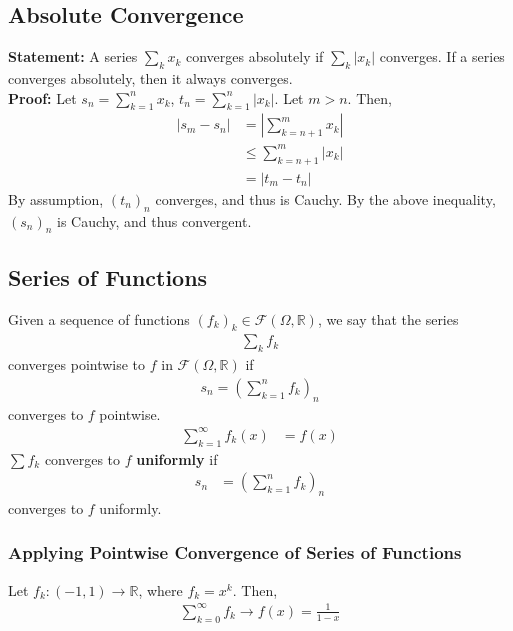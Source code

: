 \documentclass[10pt]{extarticle}
\newcommand{\R}{\mathbb{R}}
\begin{document}
  \subsection{Absolute Convergence}%
    \textbf{Statement:} A series $\sum_k x_k$ converges absolutely if $\sum_k |x_k|$ converges. If a series converges absolutely, then it always converges.\\

    \textbf{Proof:} Let $s_n = \sum_{k=1}^{n}x_k$, $t_n = \sum_{k=1}^{n}|x_k|$. Let $m > n$. Then,
    \begin{align*}
      \left|s_m - s_n\right| &= \left|\sum_{k=n+1}^{m}x_k\right|\\
                             &\leq \sum_{k=n+1}^{m}|x_k|\tag*{Triangle Inequality}\\
                             &= |t_m - t_n|
    \end{align*}
    By assumption, $(t_n)_n$ converges, and thus is Cauchy. By the above inequality, $(s_n)_n$ is Cauchy, and thus convergent.
  \subsection{Series of Functions}%
    Given a sequence of functions $(f_k)_k \in \mathcal{F}(\Omega,\R)$, we say that the series
    \begin{align*}
      \sum_{k}f_k
    \end{align*}
    converges pointwise to $f$ in $\mathcal{F}(\Omega,\R)$ if
    \begin{align*}
      s_n = \left(\sum_{k=1}^{n}f_k\right)_n
    \end{align*}
    converges to $f$ pointwise.
    \begin{align*}
      \sum_{k=1}^{\infty}f_k(x) &= f(x) \tag*{$\forall x\in\Omega$}
    \end{align*}
    $\sum f_k$ converges to $f$ \textbf{uniformly} if
    \begin{align*}
      s_n &= \left(\sum_{k=1}^{n} f_k\right)_n
    \end{align*}
    converges to $f$ uniformly.
    \subsubsection{Applying Pointwise Convergence of Series of Functions}%
      Let $f_k: (-1,1) \rightarrow \R$, where $f_k = x^k$. Then,
      \begin{align*}
        \sum_{k=0}^{\infty}f_k \rightarrow f(x) = \frac{1}{1-x}
      \end{align*}
\end{document}
